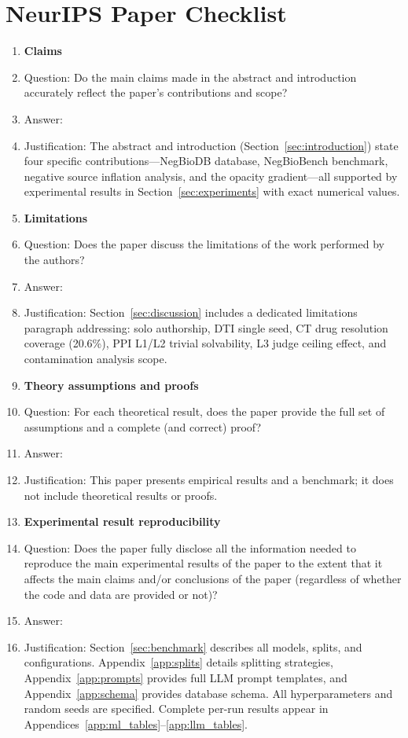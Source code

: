 \section*{NeurIPS Paper Checklist}

\begin{enumerate}

\item {\bf Claims}
    \item[] Question: Do the main claims made in the abstract and introduction accurately reflect the paper's contributions and scope?
    \item[] Answer: \answerYes{}
    \item[] Justification: The abstract and introduction (Section~\ref{sec:introduction}) state four specific contributions---NegBioDB database, NegBioBench benchmark, negative source inflation analysis, and the opacity gradient---all supported by experimental results in Section~\ref{sec:experiments} with exact numerical values.

\item {\bf Limitations}
    \item[] Question: Does the paper discuss the limitations of the work performed by the authors?
    \item[] Answer: \answerYes{}
    \item[] Justification: Section~\ref{sec:discussion} includes a dedicated limitations paragraph addressing: solo authorship, DTI single seed, CT drug resolution coverage (20.6\%), PPI L1/L2 trivial solvability, L3 judge ceiling effect, and contamination analysis scope.

\item {\bf Theory assumptions and proofs}
    \item[] Question: For each theoretical result, does the paper provide the full set of assumptions and a complete (and correct) proof?
    \item[] Answer: \answerNA{}
    \item[] Justification: This paper presents empirical results and a benchmark; it does not include theoretical results or proofs.

    \item {\bf Experimental result reproducibility}
    \item[] Question: Does the paper fully disclose all the information needed to reproduce the main experimental results of the paper to the extent that it affects the main claims and/or conclusions of the paper (regardless of whether the code and data are provided or not)?
    \item[] Answer: \answerYes{}
    \item[] Justification: Section~\ref{sec:benchmark} describes all models, splits, and configurations. Appendix~\ref{app:splits} details splitting strategies, Appendix~\ref{app:prompts} provides full LLM prompt templates, and Appendix~\ref{app:schema} provides database schema. All hyperparameters and random seeds are specified. Complete per-run results appear in Appendices~\ref{app:ml_tables}--\ref{app:llm_tables}.


\end{enumerate}

